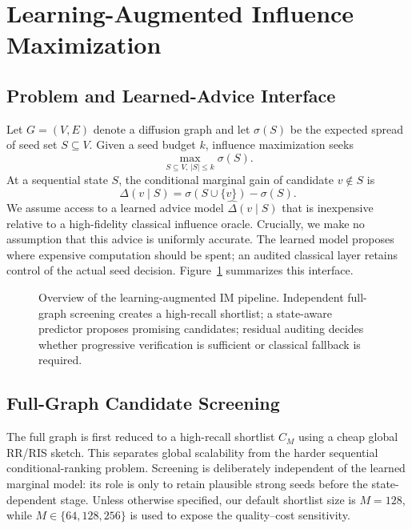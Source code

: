 \section{Learning-Augmented Influence Maximization}
\label{sec:method}

\subsection{Problem and Learned-Advice Interface}
Let $G=(V,E)$ denote a diffusion graph and let $\sigma(S)$ be the expected spread of seed set $S\subseteq V$. Given a seed budget $k$, influence maximization seeks
\begin{equation}
    \max_{S\subseteq V,\, |S|\le k} \sigma(S).
\end{equation}
At a sequential state $S$, the conditional marginal gain of candidate $v\notin S$ is
\begin{equation}
    \Delta(v\mid S)=\sigma(S\cup\{v\})-\sigma(S).
\end{equation}
We assume access to a learned advice model $\widehat{\Delta}(v\mid S)$ that is inexpensive relative to a high-fidelity classical influence oracle. Crucially, we make no assumption that this advice is uniformly accurate. The learned model proposes where expensive computation should be spent; an audited classical layer retains control of the actual seed decision. Figure~\ref{fig:overview} summarizes this interface.

\begin{figure}[t]
    \centering
    \resizebox{0.98\linewidth}{!}{}
    \caption{Overview of the learning-augmented IM pipeline. Independent full-graph screening creates a high-recall shortlist; a state-aware predictor proposes promising candidates; residual auditing decides whether progressive verification is sufficient or classical fallback is required.}
    \label{fig:overview}
\end{figure}

\subsection{Full-Graph Candidate Screening}
The full graph is first reduced to a high-recall shortlist $C_M$ using a cheap global RR/RIS sketch. This separates global scalability from the harder sequential conditional-ranking problem. Screening is deliberately independent of the learned marginal model: its role is only to retain plausible strong seeds before the state-dependent stage. Unless otherwise specified, our default shortlist size is $M=128$, while $M\in\{64,128,256\}$ is used to expose the quality--cost sensitivity.

